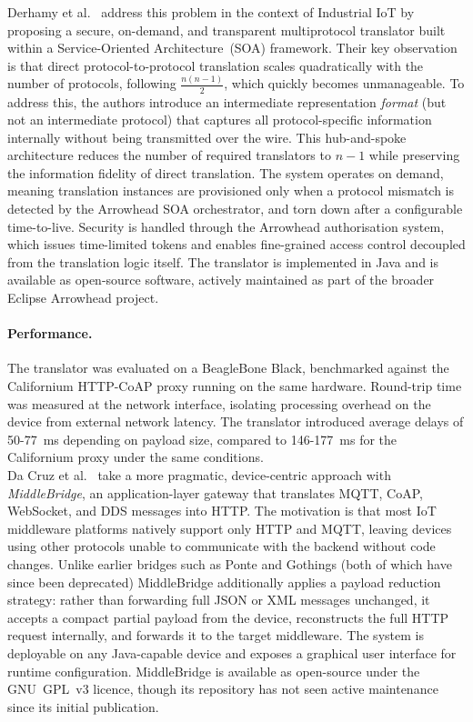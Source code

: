 Derhamy et al.~\cite{derhamy2017} address this problem in the context of Industrial IoT by proposing a secure, on-demand, and transparent multiprotocol translator built within a Service-Oriented Architecture~(SOA) framework. Their key observation is that direct protocol-to-protocol translation scales quadratically with the number of protocols, following $\frac{n(n-1)}{2}$, which quickly becomes unmanageable. To address this, the authors introduce an intermediate representation \emph{format} (but not an intermediate protocol) that captures all protocol-specific information internally without being transmitted over the wire. This hub-and-spoke architecture reduces the number of required translators to $n-1$ while preserving the information fidelity of direct translation. The system operates on demand, meaning translation instances are provisioned only when a protocol mismatch is detected by the Arrowhead SOA orchestrator, and torn down after a configurable time-to-live. Security is handled through the Arrowhead authorisation system, which issues time-limited tokens and enables fine-grained access control decoupled from the translation logic itself. The translator is implemented in Java and is available as open-source software, actively maintained as part of the broader Eclipse Arrowhead project.

\paragraph{Performance.}
The translator was evaluated on a BeagleBone Black, benchmarked against the Californium HTTP-CoAP proxy running on the same hardware. Round-trip time was measured at the network interface, isolating processing overhead on the device from external network latency. The translator introduced average delays of 50-77~ms depending on payload size, compared to 146-177~ms for the Californium proxy under the same conditions. \\

Da Cruz et al.~\cite{dacruz2019} take a more pragmatic, device-centric approach with \emph{MiddleBridge}, an application-layer gateway that translates MQTT, CoAP, WebSocket, and DDS messages into HTTP. The motivation is that most IoT middleware platforms natively support only HTTP and MQTT, leaving devices using other protocols unable to communicate with the backend without code changes. Unlike earlier bridges such as Ponte and Gothings (both of which have since been deprecated) MiddleBridge additionally applies a payload reduction strategy: rather than forwarding full JSON or XML messages unchanged, it accepts a compact partial payload from the device, reconstructs the full HTTP request internally, and forwards it to the target middleware. The system is deployable on any Java-capable device and exposes a graphical user interface for runtime configuration. MiddleBridge is available as open-source under the GNU~GPL~v3 licence, though its repository has not seen active maintenance since its initial publication.

